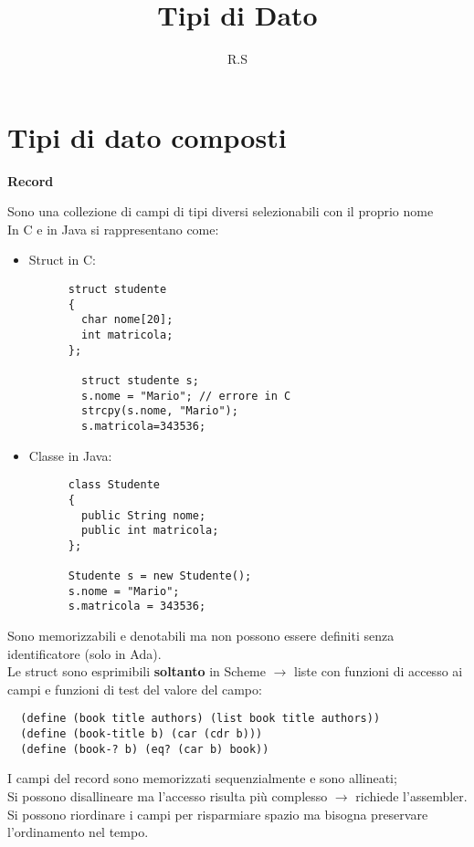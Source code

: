 \documentclass{article}
\title{Tipi di Dato}
\author{R.S}
\begin{document}
\maketitle

\section*{Tipi di dato composti}

\textbf{Record}

\begin{flushleft}

Sono una collezione di campi di tipi diversi selezionabili con il proprio nome \\    
In C e in Java si rappresentano come:
\begin{itemize}
    \item Struct in C: 
    \begin{lstlisting}
      struct studente 
      {
        char nome[20];
        int matricola; 
      };
        
        struct studente s;
        s.nome = "Mario"; // errore in C
        strcpy(s.nome, "Mario");
        s.matricola=343536;
    \end{lstlisting}
    \item Classe in Java:
    \begin{lstlisting}
      class Studente 
      {
        public String nome;
        public int matricola;
      };
      
      Studente s = new Studente();
      s.nome = "Mario";
      s.matricola = 343536;
    \end{lstlisting}
\end{itemize}

Sono memorizzabili e denotabili ma non possono essere definiti senza identificatore (solo in Ada). \\
Le struct sono esprimibili \textbf{soltanto} in Scheme $\rightarrow$ liste con funzioni di accesso ai campi e 
funzioni di test del valore del campo:

\begin{lstlisting}
  (define (book title authors) (list book title authors))
  (define (book-title b) (car (cdr b)))
  (define (book-? b) (eq? (car b) book))
\end{lstlisting}

I campi del record sono memorizzati sequenzialmente e sono allineati; \\
Si possono disallineare ma l'accesso risulta più complesso $\rightarrow$ richiede l'assembler. \\
Si possono riordinare i campi per risparmiare spazio ma bisogna preservare l'ordinamento nel tempo.


\end{flushleft}
\end{document}
